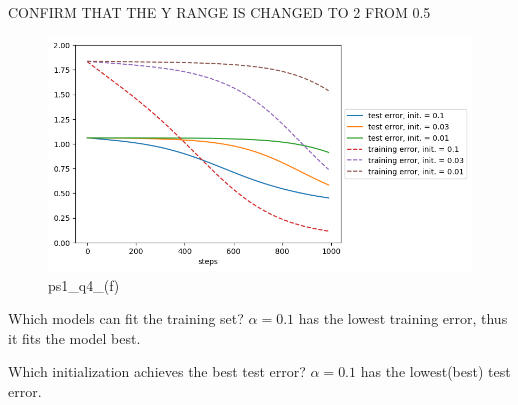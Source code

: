 
\begin{answer}

CONFIRM THAT THE Y RANGE IS CHANGED TO 2 FROM 0.5

\begin{figure}
    \centering
    \includegraphics[width=0.5\linewidth]{implicitreg_quadratic_initialization.png}
    \caption{ps1\_q4\_(f)}
    \label{fig:enter-label}
\end{figure}

Which models can fit the training set?  $\alpha = 0.1$ has the lowest training error, thus it fits the model best.

Which initialization achieves the best test error? $\alpha = 0.1$ has the lowest(best) test error. 
\end{answer}